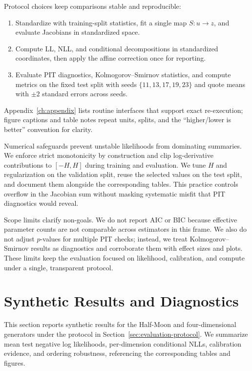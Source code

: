 \documentclass[11pt,a4paper,twoside]{book}\usepackage[]{graphicx}\usepackage[]{xcolor}
\begin{document}
Protocol choices keep comparisons stable and reproducible:
\begin{enumerate}
  \item Standardize with training-split statistics, fit a single map $S:u \rightarrow z$, and evaluate Jacobians in standardized space.
  \item Compute LL, NLL, and conditional decompositions in standardized coordinates, then apply the affine correction once for reporting.
  \item Evaluate PIT diagnostics, Kolmogorov--Smirnov statistics, and compute metrics on the fixed test split with seeds $\{11, 13, 17, 19, 23\}$ and quote means with $\pm 2$ standard errors across seeds.
\end{enumerate}
Appendix~\ref{ch:appendix} lists routine interfaces that support exact re-execution; figure captions and table notes repeat units, splits, and the “higher/lower is better” convention for clarity.

Numerical safeguards prevent unstable likelihoods from dominating summaries. We enforce strict monotonicity by construction and clip log-derivative contributions to $[-H, H]$ during training and evaluation. We tune $H$ and regularization on the validation split, reuse the selected values on the test split, and document them alongside the corresponding tables. This practice controls overflow in the Jacobian sum without masking systematic misfit that PIT diagnostics would reveal.

Scope limits clarify non-goals. We do not report AIC or BIC because effective parameter counts are not comparable across estimators in this frame. We also do not adjust $p$-values for multiple PIT checks; instead, we treat Kolmogorov--Smirnov results as diagnostics and corroborate them with effect sizes and plots. These limits keep the evaluation focused on likelihood, calibration, and compute under a single, transparent protocol.

\section{Synthetic Results and Diagnostics}\label{sec:synthetic-results}

This section reports synthetic results for the Half-Moon and four-dimensional generators under the protocol in Section~\ref{sec:evaluation-protocol}. We summarize mean test negative log likelihoods, per-dimension conditional NLLs, calibration evidence, and ordering robustness, referencing the corresponding tables and figures.
\end{document}
